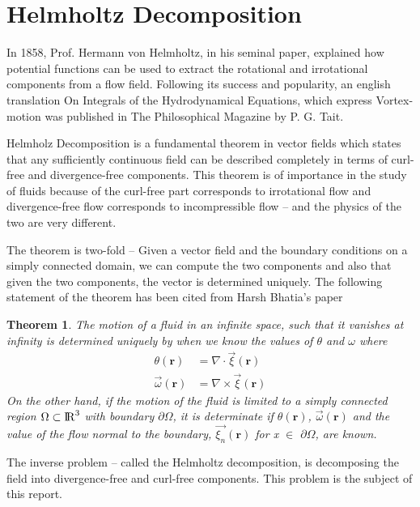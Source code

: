\documentclass[12pt, a4paper]{report}
\newtheorem{theorem}{Theorem}
\begin{document}
\section{Helmholtz Decomposition}

In 1858, Prof. Hermann von Helmholtz, in his seminal paper, explained how potential functions can be used to extract the rotational and irrotational components from a flow field. Following its success and popularity, an english translation On Integrals of the Hydrodynamical Equations, which express Vortex-motion was published in The Philosophical Magazine by P. G. Tait.


Helmholz Decomposition is a fundamental theorem in vector fields which states that any sufficiently continuous field can be described completely in terms of curl-free and divergence-free components. This theorem is of importance in the study of fluids because of the curl-free part corresponds to irrotational flow and divergence-free flow corresponds to incompressible flow -- and the physics of the two are very different.

The theorem is two-fold -- Given a vector field and the boundary conditions on a simply connected domain, we can compute the two components and also that given the two components, the vector is determined uniquely. The following statement of the theorem has been cited from Harsh Bhatia's paper\cite{harsh}

\begin{theorem}
The motion of a fluid in an infinite space, such that it vanishes at infinity is determined uniquely by when we know the values of $\theta$ and $\omega$ where\\
\begin{align}
    \theta(\mathbf {r}) &= \nabla \cdot \vec{\xi}(\mathbf {r})\\
    \vec{\omega}(\mathbf {r}) &= \nabla \times \vec{\xi}(\mathbf {r})
\end{align}
On the other hand, if the motion of the fluid is limited to a simply connected region $\Omega \subset {\rm I\!R}^3$ with boundary $\partial\Omega$, it is determinate if $\theta(\mathbf {r})$, $\vec{\omega}(\mathbf {r})$ and the value of the flow normal to the boundary, $\vec{\xi_n}(\mathbf {r})$ for x $\in$ $\partial\Omega$, are known.

\end{theorem}
The inverse problem -- called the Helmholtz decomposition, is decomposing the field into divergence-free and curl-free components. This problem is the subject of this report.
\end{document}
